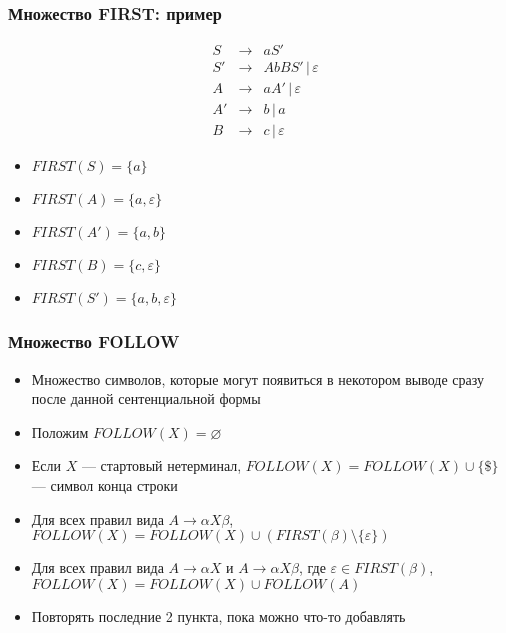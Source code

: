 \documentclass{beamer}
\begin{document}
\begin{frame}[fragile]
  \transwipe[direction=90]
  \frametitle{Множество FIRST: пример}
  $$
  \begin{array}{crcl}
  &S  & \rightarrow & a S' \\
  
  &S' & \rightarrow & A b B S' \, | \, \varepsilon \\
  
  &A  & \rightarrow & a A' \, | \, \varepsilon \\
  &A' & \rightarrow & b \, | \, a \\
  &B  & \rightarrow & c \, | \, \varepsilon  
  \end{array}
  $$ \pause
  
  \begin{itemize}
    \item $FIRST(S) = \{ a \}$ \pause
    \item $FIRST(A) = \{ a, \varepsilon \}$ \pause
    \item $FIRST(A') = \{ a, b \}$ \pause
    \item $FIRST(B) = \{ c, \varepsilon \}$ \pause
    \item $FIRST(S') = \{ a, b, \varepsilon \}$ 
  \end{itemize}
\end{frame}

\begin{frame}[fragile]
  \transwipe[direction=90]
  \frametitle{Множество FOLLOW}
  \begin{itemize}
   \item Множество символов, которые могут появиться в некотором выводе сразу после данной сентенциальной формы
   \item Положим $FOLLOW(X) = \varnothing $
   \item Если $X$ --- стартовый нетерминал, $FOLLOW(X) = FOLLOW(X) \cup \{ \$ \}$ --- символ конца строки
   \item Для всех правил вида $A \rightarrow \alpha X \beta$, $FOLLOW(X) = FOLLOW(X) \cup (FIRST(\beta) \setminus \{ \varepsilon\})$
   \item Для всех правил вида $A \rightarrow \alpha X$ и $A \rightarrow \alpha X \beta$, где $\varepsilon \in FIRST(\beta)$, $FOLLOW(X) = FOLLOW(X) \cup FOLLOW(A)$
   \item Повторять последние 2 пункта, пока можно что-то добавлять
  \end{itemize}
\end{frame}
\end{document}
